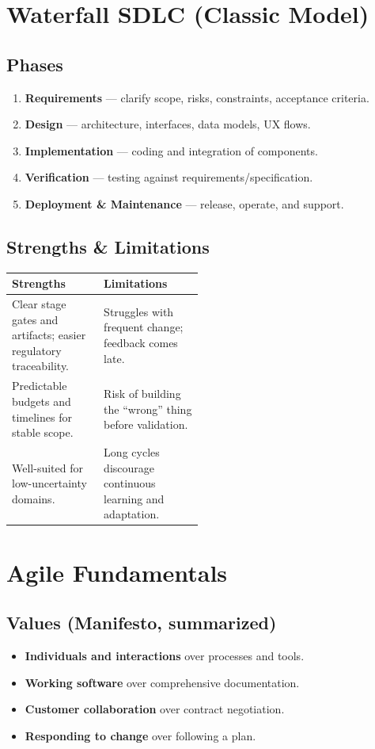 \documentclass[11pt]{article}
\providecommand{\term}[1]{\textbf{#1}}
\begin{document}
\section{Waterfall SDLC (Classic Model)}
\subsection{Phases}
\begin{enumerate}
  \item \term{Requirements} — clarify scope, risks, constraints, acceptance criteria.
  \item \term{Design} — architecture, interfaces, data models, UX flows.
  \item \term{Implementation} — coding and integration of components.
  \item \term{Verification} — testing against requirements/specification.
  \item \term{Deployment \& Maintenance} — release, operate, and support.
\end{enumerate}

\subsection{Strengths \& Limitations}
\begin{tabularx}{\linewidth}{@{}>{\raggedright\arraybackslash}p{0.48\linewidth} >{\raggedright\arraybackslash}X@{}}
\toprule
\textbf{Strengths} & \textbf{Limitations} \\
\midrule
Clear stage gates and artifacts; easier regulatory traceability. & Struggles with frequent change; feedback comes late. \\
Predictable budgets and timelines for stable scope. & Risk of building the ``wrong'' thing before validation. \\
Well-suited for low-uncertainty domains. & Long cycles discourage continuous learning and adaptation. \\
\bottomrule
\end{tabularx}

\section{Agile Fundamentals}
\subsection{Values (Manifesto, summarized)}
\begin{itemize}
  \item \term{Individuals and interactions} over processes and tools.
  \item \term{Working software} over comprehensive documentation.
  \item \term{Customer collaboration} over contract negotiation.
  \item \term{Responding to change} over following a plan.
\end{itemize}
\end{document}

